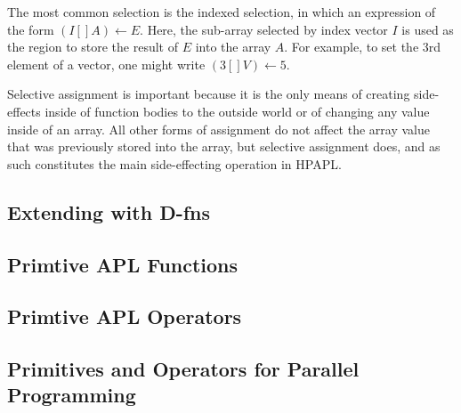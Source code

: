 The most common selection is the indexed selection, in which an 
expression of the form $(I[]A)\gets E$. Here, the sub-array selected 
by index vector $I$ is used as the region to store the result of $E$ 
into the array $A$. For example, to set the 3rd element of a vector, 
one might write $(3[]V)\gets 5$. 

Selective assignment is important because it is the only means of creating 
side-effects inside of function bodies to the outside world or of changing 
any value inside of an array. All other forms of assignment do not affect 
the array value that was previously stored into the array, but selective 
assignment does, and as such constitutes the main side-effecting operation 
in HPAPL.

\subsection{Extending with D-fns}

\subsection{Primtive APL Functions}

\subsection{Primtive APL Operators}

\subsection{Primitives and Operators for Parallel Programming}


